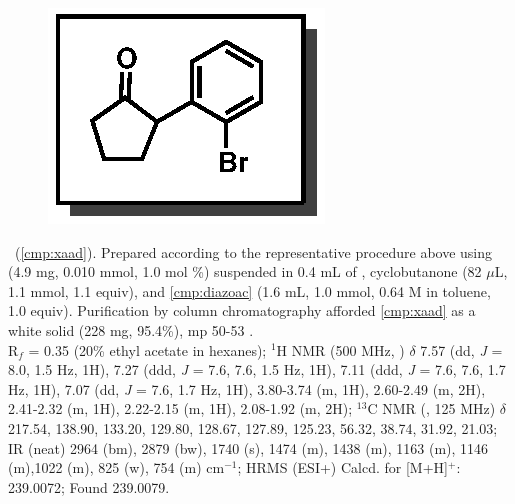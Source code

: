 \vspace{10pt}
\begin{figure}
  \vspace{-25pt}
  \begin{center}
    \includegraphics[scale=0.8]{chp_asymmetric/images/xaad}
  \end{center}
  \vspace{-30pt}
\end{figure}\noindent \textbf{\CMPxaad}\ (\ref{cmp:xaad}). Prepared
according to the representative procedure above using  (4.9 mg,
0.010 mmol, 1.0 mol \%) suspended in 0.4 mL of , cyclobutanone (82
$\mu$L, 1.1 mmol, 1.1 equiv), and \ref{cmp:diazoac} (1.6 mL, 1.0 mmol, 0.64 M in
toluene, 1.0 equiv). Purification by column chromatography afforded
\ref{cmp:xaad} as a white solid (228 mg, 95.4\%), mp 50-53 \degc. \\
R$_f$ = 0.35 (20\% ethyl acetate in hexanes); $^1$H NMR (500 MHz, )
$\delta$ 7.57 (dd, \textit{J} =  8.0, 1.5 Hz, 1H), 7.27 (ddd, \textit{J} =  7.6, 7.6, 1.5 Hz, 1H),
7.11 (ddd, \textit{J} =  7.6, 7.6, 1.7 Hz, 1H), 7.07 (dd, \textit{J} =  7.6, 1.7
Hz, 1H), 3.80-3.74 (m, 1H), 2.60-2.49 (m, 2H), 2.41-2.32 (m, 1H), 2.22-2.15 (m,
1H), 2.08-1.92 (m, 2H); $^{13}$C NMR (, 125 MHz) $\delta$ 217.54,
138.90, 133.20, 129.80, 128.67, 127.89, 125.23, 56.32, 38.74, 31.92, 21.03; IR
(neat) 2964 (bm), 2879 (bw), 1740 (s), 1474 (m), 1438 (m), 1163 (m), 1146
(m),1022 (m), 825 (w), 754 (m) cm$^{-1}$; HRMS (ESI+) Calcd. for 
[M+H]$^+$: 239.0072; Found 239.0079. 


